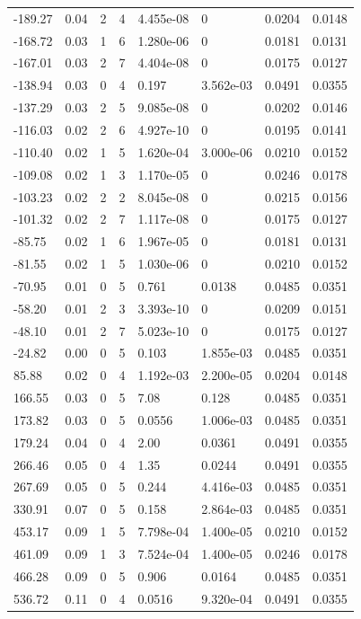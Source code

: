 \documentclass[preview]{standalone}
\begin{document}
{{\begin{tabular}{L{1.2cm}C{1.2cm} C{0.3cm}C{0.5cm} C{1.4cm}C{1.4cm} C{1.4cm}C{1.4cm}}
  -189.27  &  0.04  & 2     &  4 &  4.455e-08  & 0  & 0.0204 &  0.0148   \\ 
  -168.72  &  0.03  & 1     &  6 &  1.280e-06  & 0  & 0.0181 &  0.0131   \\ 
  -167.01  &  0.03  & 2     &  7 &  4.404e-08  & 0  & 0.0175 &  0.0127   \\ 
  -138.94  &  0.03  & 0     &  4 &  0.197  & 3.562e-03  & 0.0491 &  0.0355   \\ 
  -137.29  &  0.03  & 2     &  5 &  9.085e-08  & 0  & 0.0202 &  0.0146   \\ 
  -116.03  &  0.02  & 2     &  6 &  4.927e-10  & 0  & 0.0195 &  0.0141   \\ 
  -110.40  &  0.02  & 1     &  5 &  1.620e-04  & 3.000e-06  & 0.0210 &  0.0152   \\ 
  -109.08  &  0.02  & 1     &  3 &  1.170e-05  & 0  & 0.0246 &  0.0178   \\ 
  -103.23  &  0.02  & 2     &  2 &  8.045e-08  & 0  & 0.0215 &  0.0156   \\ 
  -101.32  &  0.02  & 2     &  7 &  1.117e-08  & 0  & 0.0175 &  0.0127   \\ 
  -85.75  &  0.02  & 1     &  6 &  1.967e-05  & 0  & 0.0181 &  0.0131   \\ 
  -81.55  &  0.02  & 1     &  5 &  1.030e-06  & 0  & 0.0210 &  0.0152   \\ 
  -70.95  &  0.01  & 0     &  5 &  0.761  & 0.0138  & 0.0485 &  0.0351   \\ 
  -58.20  &  0.01  & 2     &  3 &  3.393e-10  & 0  & 0.0209 &  0.0151   \\ 
  -48.10  &  0.01  & 2     &  7 &  5.023e-10  & 0  & 0.0175 &  0.0127   \\ 
  -24.82  &  0.00  & 0     &  5 &  0.103  & 1.855e-03  & 0.0485 &  0.0351   \\ 
  85.88  &  0.02  & 0     &  4 &  1.192e-03  & 2.200e-05  & 0.0204 &  0.0148   \\ 
  166.55  &  0.03  & 0     &  5 &  7.08  & 0.128  & 0.0485 &  0.0351   \\ 
  173.82  &  0.03  & 0     &  5 &  0.0556  & 1.006e-03  & 0.0485 &  0.0351   \\ 
  179.24  &  0.04  & 0     &  4 &  2.00  & 0.0361  & 0.0491 &  0.0355   \\ 
  266.46  &  0.05  & 0     &  4 &  1.35  & 0.0244  & 0.0491 &  0.0355   \\ 
  267.69  &  0.05  & 0     &  5 &  0.244  & 4.416e-03  & 0.0485 &  0.0351   \\ 
  330.91  &  0.07  & 0     &  5 &  0.158  & 2.864e-03  & 0.0485 &  0.0351   \\ 
  453.17  &  0.09  & 1     &  5 &  7.798e-04  & 1.400e-05  & 0.0210 &  0.0152   \\ 
  461.09  &  0.09  & 1     &  3 &  7.524e-04  & 1.400e-05  & 0.0246 &  0.0178   \\ 
  466.28  &  0.09  & 0     &  5 &  0.906  & 0.0164  & 0.0485 &  0.0351   \\ 
  536.72  &  0.11  & 0     &  4 &  0.0516  & 9.320e-04  & 0.0491 &  0.0355   \\ 
\hline 
\end{tabular} 

}}
\end{document}
